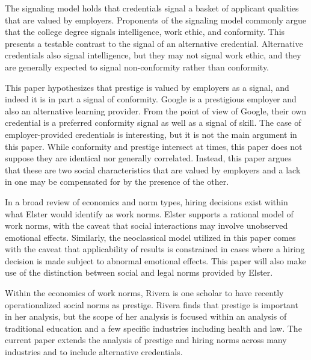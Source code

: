\documentclass[review]{elsarticle}
\begin{document}
The signaling model holds that credentials signal a basket of applicant qualities that are valued by employers.
Proponents of the signaling model commonly argue that the college degree signals intelligence,
work ethic, and conformity\cite{caplan_2012}.
This presents a testable contrast to the signal of an alternative credential.
Alternative credentials also signal intelligence,
but they may not signal work ethic,
and they are generally expected to signal non-conformity rather than conformity.

This paper hypothesizes that prestige is valued by employers as a signal,
and indeed it is in part a signal of conformity.
Google is a prestigious employer and also an alternative learning provider.
From the point of view of Google, their own credential is a preferred conformity signal as well as a signal of skill.
The case of employer-provided credentials is interesting,
but it is not the main argument in this paper.
While conformity and prestige intersect at times,
this paper does not suppose they are identical nor generally correlated.
Instead, this paper argues that these are two social characteristics that are valued by employers
and a lack in one may be compensated for by the presence of the other.

In a broad review of economics and norm types, hiring decisions exist within what Elster would identify as work norms\cite{elster1989social}.
Elster supports a rational model of work norms, with the caveat that social interactions may involve unobserved emotional effects.
Similarly, the neoclassical model utilized in this paper comes with the caveat that
applicability of results is constrained in cases where a hiring decision is made subject to abnormal emotional effects.
This paper will also make use of the distinction between social and legal norms provided by Elster.

Within the economics of work norms, Rivera is one scholar to have recently operationalized social norms as prestige\cite{rivera2016pedigree}.
Rivera finds that prestige is important in her analysis, but the scope of her analysis is focused
within an analysis of traditional education and a few specific industries including health and law.
The current paper extends the analysis of prestige and hiring norms
across many industries and to include alternative credentials.
\end{document}
